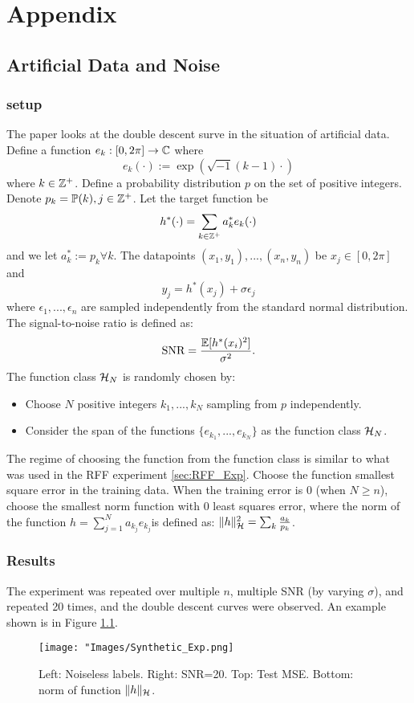 \documentclass[twoside]{memoir}
\begin{document}
\chapter{Appendix}
\section{Artificial Data and Noise}
\subsection{setup}
The paper looks at the double descent surve  in the situation of artificial data. Define a function $e_k: [0, 2\pi] \rightarrow \mathbb{C}$ where
\[ e_k(\cdot) := \exp(\sqrt{-1}(k - 1) \cdot) \]
where $k \in \mathbb{Z}^+$. Define a probability distribution $p$ on the set of positive integers. Denote $p_k = \mathbb{P}(k), j \in \mathbb{Z}^+$.
Let the target function be
\[ h^*(\cdot) = \sum_{k \in \mathbb{Z}^+} a^*_k e_k(\cdot)\]
and we let $a_k^* := p_k \forall k$. The datapoints $(x_1, y_1), ..., (x_n, y_n)$ be $x_j \in [0, 2\pi]$ and 
\[ y_j = h^*(x_j) + \sigma\epsilon_j \]
where $\epsilon_1,..., \epsilon_n$ are sampled independently from the standard normal distribution.\\
The signal-to-noise ratio is defined as:
\[ \text{SNR} = \frac{\mathbb{E}[h^*(x_i)^2]}{\sigma^2}. \]
The function class $\mathcal{H}_N$ is randomly chosen by:
\begin{itemize}
	\item Choose $N$ positive integers $k_1,..., k_N$ sampling from $p$ independently.
	\item Consider the span of the functions $\{ e_{k_1},..., e_{k_N} \}$ as the function class $\mathcal{H}_N$.
\end{itemize}
The regime of choosing the function from the function class is similar to what was used in the RFF experiment \ref{sec:RFF_Exp}. Choose the function smallest square error in the training data. When the training error is 0 (when $N \geq n$), choose the smallest norm function with 0 least squares error, where the norm of the function $h = \sum_{j=1}^{N} a_{k_j} e_{k_j} $is defined as: $\lVert h\rVert^2_{\mathcal{H}} = \sum_{k}\frac{a_k}{p_k}$.
\subsection{Results}
The experiment was repeated over multiple $n$, multiple SNR (by varying $\sigma$), and repeated 20 times, and the double descent curves were observed. An example shown is in Figure \ref{fig:Synthetic_Exp}.
\begin{figure}
	\centering
	\texttt{[image: "Images/Synthetic\_Exp.png]}
	\par
	\caption{Left: Noiseless labels. Right: SNR=20. Top: Test MSE. Bottom: norm of function $\lVert h\rVert_{\mathcal{H}}$.} \label{fig:Synthetic_Exp}
\end{figure}
\backmatter


\end{document}
